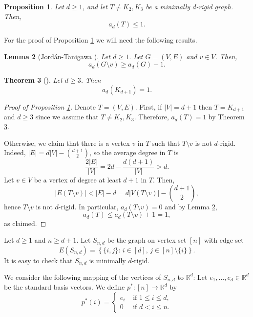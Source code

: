 \documentclass[a4paper,11pt]{article}
\theoremstyle{plain}
\newtheorem{theorem}{\bf Theorem}[section]
\newtheorem{proposition}[theorem]{\bf Proposition}
\newtheorem{lemma}[theorem]{\bf Lemma}
\theoremstyle{definition}
\newcommand{\Rea}{{\mathbb R}}
\newcommand{\px}{p^*}
\begin{document}
\begin{proposition}\label{prop:upper_bound_minimmaly_rigid}
Let $d\geq 1$, and let $T\neq K_2, K_3$ be a minimally $d$-rigid graph. Then,
\[
    a_d(T)\leq 1.
\]
\end{proposition}

For the proof of Proposition \ref{prop:upper_bound_minimmaly_rigid} we will need the following results.

\begin{lemma}[Jord\'an-Tanigawa {\cite[Lemma 4.5]{jordan2022rigidity}}]\label{lemma:vertex_removal}
Let $d\geq 1$. Let $G=(V,E)$ and $v\in V$. Then,
\[
    a_d(G\setminus v)\geq a_d(G)-1.
\]
\end{lemma}

\begin{theorem}[{\cite[Theorem 1.2]{lew2022d}}]\label{thm:simplex}
Let $d\geq 3$. Then
\[
    a_d(K_{d+1})=1.
\]
\end{theorem}




\begin{proof}[Proof of Proposition \ref{prop:upper_bound_minimmaly_rigid}]
Denote $T=(V,E)$. 
First, if $|V|=d+1$ then $T=K_{d+1}$ and $d\geq 3$ since we assume that $T\neq K_2, K_3$. Therefore, $a_d(T)=1$ by Theorem \ref{thm:simplex}.

Otherwise, we claim that there is a vertex $v$ in $T$ such that $T\setminus v$ is not $d$-rigid. Indeed, $|E|=d|V|-\binom{d+1}{2}$, so the average degree in $T$ is
\[
    \frac{2|E|}{|V|}= 2d- \frac{d(d+1)}{|V|} >d.
\]
Let $v\in V $ be a vertex of degree at least $d+1$ in $T$. Then, 
\[
|E(T\setminus v)| < |E| - d = d|V(T\setminus v)| - \binom{d+1}{2},
\]
hence $T\setminus v$ is not $d$-rigid. In particular, $a_d(T\setminus v)=0$ and by Lemma \ref{lemma:vertex_removal},
\[
    a_d(T) \le a_d(T\setminus v)+1 =1,
\]
as claimed.
\end{proof}

Let $d\geq 1$ and $n\geq d+1$. Let $S_{n,d}$ be the graph on vertex set $[n]$ with edge set
\[
    E(S_{n,d})=\left\{ \{i,j\}:\, i\in[d],\,  j\in[n]\setminus\{i\}\right\}.
\]
It is easy to check that $S_{n,d}$ is minimally $d$-rigid. 

We consider the following mapping of the vertices of $S_{n,d}$ to $\Rea^d$:
Let $e_1,\ldots,e_d\in \Rea^d$ be the standard basis vectors. We define $\px:[n]\to \Rea^d$ by
\[
    \px(i)=\begin{cases}
        e_i & \text{ if } 1\leq i\leq d,\\
        0 & \text{ if } d<i\leq n.
    \end{cases}
\]
\end{document}

